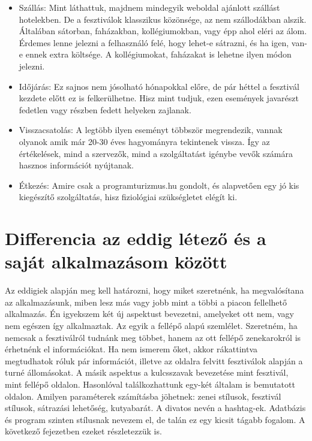 \begin{itemize}
\item Szállás: Mint láthattuk, majdnem mindegyik weboldal ajánlott szállást hotelekben. De a fesztiválok klasszikus közönsége, az nem szállodákban alszik. Általában sátorban, faházakban, kollégiumokban, vagy épp ahol eléri az álom. Érdemes lenne jelezni a felhasználó felé, hogy lehet-e sátrazni, és ha igen, van-e ennek extra költsége. A kollégiumokat, faházakat is lehetne ilyen módon jelezni.

\item Időjárás: Ez sajnos nem jósolható hónapokkal előre, de pár héttel a fesztivál kezdete előtt ez is felkerülhetne. Hisz mint tudjuk, ezen események javarészt fedetlen vagy részben fedett helyeken zajlanak.

\item Visszacsatolás: A legtöbb ilyen eseményt többször megrendezik, vannak olyanok amik már 20-30 éves hagyományra tekintenek vissza. Így az értékelések, mind a szervezők, mind a szolgáltatást igénybe vevők számára hasznos információt nyújtanak.

\item Étkezés: Amire csak a programturizmus.hu gondolt, és alapvetően egy jó kis kiegészítő szolgáltatás, hisz fiziológiai szükségletet elégít ki.

\end{itemize}

\section{Differencia az eddig létező és a saját alkalmazásom között}

Az eddigiek alapján meg kell határozni, hogy miket szeretnénk, ha megvalósítana az alkalmazásunk, miben lesz más vagy jobb mint a többi a piacon fellelhető alkalmazás. Én igyekszem két új aspektust bevezetni, amelyeket ott nem, vagy nem egészen így alkalmaztak. Az egyik a fellépő alapú szemlélet. Szeretném, ha nemcsak a fesztiválról tudnánk meg többet, hanem az ott fellépő zenekarokról is érhetnénk el információkat. Ha nem ismerem őket, akkor rákattintva megtudhatok róluk pár információt, illetve az oldalra felvitt fesztiválok alapján a turné állomásokat. A másik aspektus a kulcsszavak bevezetése mint fesztivál, mint fellépő oldalon. Hasonlóval találkozhattunk egy-két általam is bemutatott oldalon. Amilyen paraméterek számításba jöhetnek: zenei stílusok, fesztivál stílusok, sátrazási lehetőség, kutyabarát. A divatos nevén a hashtag-ek. Adatbázis és program szinten stílusnak nevezem el, de talán ez egy kicsit tágabb fogalom. A következő fejezetben ezeket részletezzük is.
